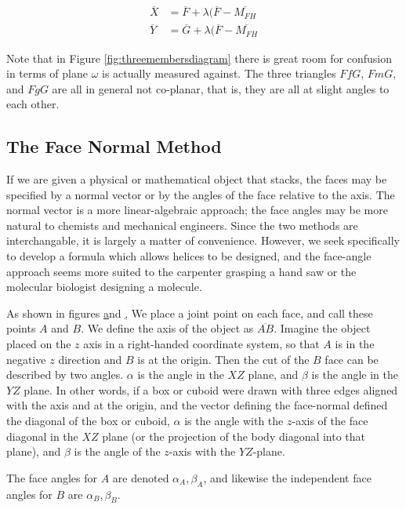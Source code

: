 \documentclass[11pt]{article}
\begin{document}
{\begin{align}
  \overline{X} &= \overline{F} + \lambda(\overline{F} - \overline{M_{FH}} \\
  \overline{Y} &= \overline{G} + \lambda(\overline{F} - \overline{M_{FH}}  
\end{align}


Note that in Figure \ref{fig:threemembersdiagram} there is great
room for confusion in terms of plane $\omega$ is actually
measured against. The three triangles $FfG$, $FmG$, and $FgG$
are all in general not co-planar, that is, they are all at
slight angles to each other.  

\subsection{The Face Normal Method}

If we are given a physical or mathematical object that stacks,
the faces may be specified by a normal vector or by the
angles of the face relative to the axis. The normal vector
is a more linear-algebraic approach; the face angles may be more
natural to chemists and mechanical engineers. Since
the two methods are interchangable, it is largely a matter of
convenience. However, we seek specifically to develop a formula
which allows helices to be designed, and the face-angle approach
seems more suited to the carpenter grasping a hand saw or the
molecular biologist designing a molecule.

As shown in figures \href{fig:intrinsicdiagram} and \href{fig:jointdiagram},
We place a joint point on each face, and call these points $A$ and $B$.
We define the axis of the object as $\overline{AB}$. Imagine the
object placed on the $z$ axis in a right-handed coordinate system, so that
$A$ is in the negative $z$ direction and $B$ is at the origin. Then
the cut of the $B$ face can be described by two angles. $\alpha$ is the
angle in the $XZ$ plane, and $\beta$ is the angle in the $YZ$ plane.
In other words, if a box or cuboid were drawn with three edges aligned
with the axis and at the origin, and the vector defining the face-normal
defined the diagonal of the box or cuboid, $\alpha$ is the angle with the $z$-axis
of the
face diagonal in the $XZ$ plane (or the projection of the body diagonal
into that plane), and $\beta$ is the angle of the $z$-axis with the $YZ$-plane.

The face angles for $A$ are denoted $\alpha_A, \beta_A$, and likewise
the independent face angles for $B$ are $\alpha_B, \beta_B$.


}
\end{document}
